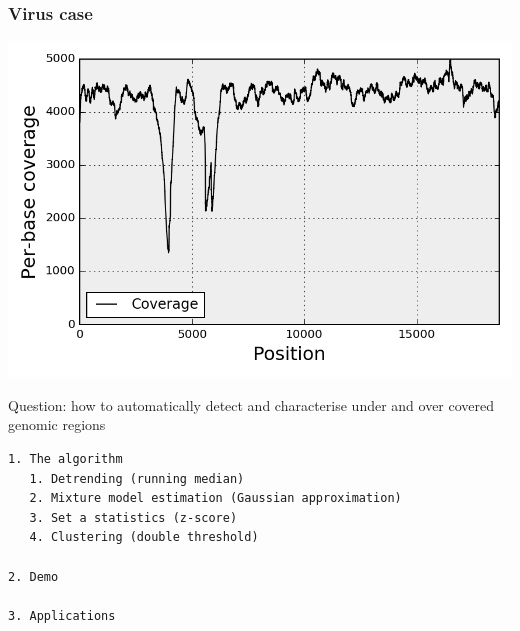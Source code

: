 \documentclass{beamer}
\begin{document}
\begin{frame}
\frametitle{\small Virus case}
\begin{center}
\includegraphics[height=0.9\textheight, 
width=1\textwidth]{images/coverage_virus.png}
\end{center}
\end{frame}


\begin{frame}
\LARGE
\begin{block}{Question: how to automatically detect and characterise under and 
over covered genomic regions}
\end{block}

\end{frame}


\begin{frame}[fragile]
 \begin{verbatim}
1. The algorithm
   1. Detrending (running median)
   2. Mixture model estimation (Gaussian approximation)
   3. Set a statistics (z-score)
   4. Clustering (double threshold)
   
2. Demo

3. Applications
\end{verbatim}
\end{frame}
\end{document}
